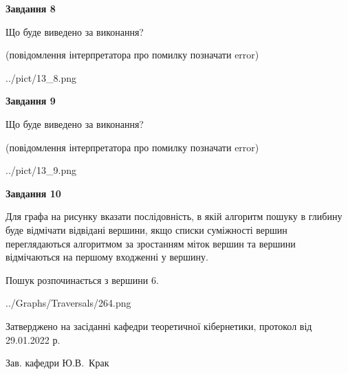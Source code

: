 \documentclass[12pt, ukrainian]{article}
\begin{document}
{\begin {large}
{\begin {center}\textbf{Завдання 8}\end {center}}\par
Що буде виведено за виконання?\par
 (повідомлення інтерпретатора про помилку позначати error)
\begin{center}
	{../pict/13_8.png}
\end{center}
\newpage

{\begin {center}\textbf{Завдання 9}\end {center}}\par
Що буде виведено за виконання?\par
 (повідомлення інтерпретатора про помилку позначати error)\par
\begin{center}
	{../pict/13_9.png}
\end{center}
\newpage

{\begin {center}\textbf{Завдання 10}\end {center}}\par
Для графа на рисунку вказати послідовність, в якій алгоритм пошуку в глибину буде відмічати відвідані вершини, якщо списки суміжності вершин переглядаються алгоритмом за зростанням міток вершин та вершини відмічаються на першому вход\-женні у вершину.\par
Пошук розпочинається з вершини 6.\par

\begin{center}
	{../Graphs/Traversals/264.png}
\end{center}\par
\newpage


\end {large}
}
{\smallskip \begin {small} Затверджено на засіданні кафедри теоретичної кібернетики, протокол  від   29.01.2022 р.\par\smallskip\smallskip
{\parbox {6.5 cm}{Зав. кафедри \dotfill Ю.В.~Крак}} \end{small}}
\end{document}
